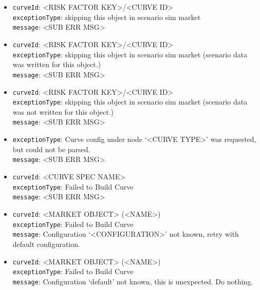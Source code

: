 \begin{itemize}

  \item \lstinline!curveId!: <RISK FACTOR KEY>/<CURVE ID> \\
        \lstinline!exceptionType!: skipping this object in scenario sim market \\
        \lstinline!message!: <SUB ERR MSG>

  \item \lstinline!curveId!: <RISK FACTOR KEY>/<CURVE ID> \\
        \lstinline!exceptionType!: skipping this object in scenario sim market (scenario data was written for this object.) \\
        \lstinline!message!: <SUB ERR MSG>

  \item \lstinline!curveId!: <RISK FACTOR KEY>/<CURVE ID> \\
        \lstinline!exceptionType!: skipping this object in scenario sim market (scenario data was not written for this object.) \\
        \lstinline!message!: <SUB ERR MSG>

  \item \lstinline!exceptionType!: Curve config under node `<CURVE TYPE>' was requested, but could not be parsed. \\
        \lstinline!message!: <SUB ERR MSG>

  \item \lstinline!curveId!: <CURVE SPEC NAME> \\
        \lstinline!exceptionType!: Failed to Build Curve \\
        \lstinline!message!: <SUB ERR MSG>

  \item \lstinline!curveId!: <MARKET OBJECT> (<NAME>) \\
        \lstinline!exceptionType!: Failed to Build Curve \\
        \lstinline!message!: Configuration `<CONFIGURATION>' not known, retry with default configuration.

  \item \lstinline!curveId!: <MARKET OBJECT> (<NAME>) \\
        \lstinline!exceptionType!: Failed to Build Curve \\
        \lstinline!message!: Configuration `default' not known, this is unexpected. Do nothing.

  \ifdefined\UserGuide
  \else
    
  \fi

\end{itemize}

